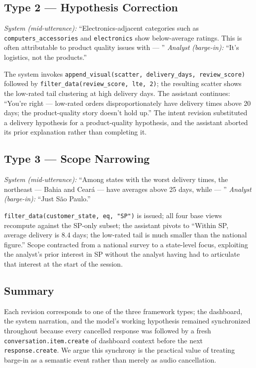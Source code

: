 \documentclass[journal]{IEEEtran}
\begin{document}
\subsection{Type 2 --- Hypothesis Correction}
\emph{System (mid-utterance):} ``Electronics-adjacent categories such as \texttt{computers\_accessories} and \texttt{electronics} show below-average ratings. This is often attributable to product quality issues with --- ''
\emph{Analyst (barge-in):} ``It's logistics, not the products.''

The system invokes \texttt{append\_visual(scatter, delivery\_days, review\_score)} followed by \texttt{filter\_data(review\_score, lte, 2)}; the resulting scatter shows the low-rated tail clustering at high delivery days. The assistant continues: ``You're right --- low-rated orders disproportionately have delivery times above 20 days; the product-quality story doesn't hold up.'' The intent revision substituted a delivery hypothesis for a product-quality hypothesis, and the assistant aborted its prior explanation rather than completing it.

\subsection{Type 3 --- Scope Narrowing}
\emph{System (mid-utterance):} ``Among states with the worst delivery times, the northeast --- Bahia and Cear\'a --- have averages above 25 days, while --- ''
\emph{Analyst (barge-in):} ``Just S\~ao Paulo.''

\texttt{filter\_data(customer\_state, eq, "SP")} is issued; all four base views recompute against the SP-only subset; the assistant pivots to ``Within SP, average delivery is 8.4 days; the low-rated tail is much smaller than the national figure.'' Scope contracted from a national survey to a state-level focus, exploiting the analyst's prior interest in SP without the analyst having had to articulate that interest at the start of the session.

\subsection{Summary}
Each revision corresponds to one of the three framework types; the dashboard, the system narration, and the model's working hypothesis remained synchronized throughout because every cancelled response was followed by a fresh \texttt{conversation.item.create} of dashboard context before the next \texttt{response.create}. We argue this synchrony is the practical value of treating barge-in as a semantic event rather than merely as audio cancellation.
\end{document}
